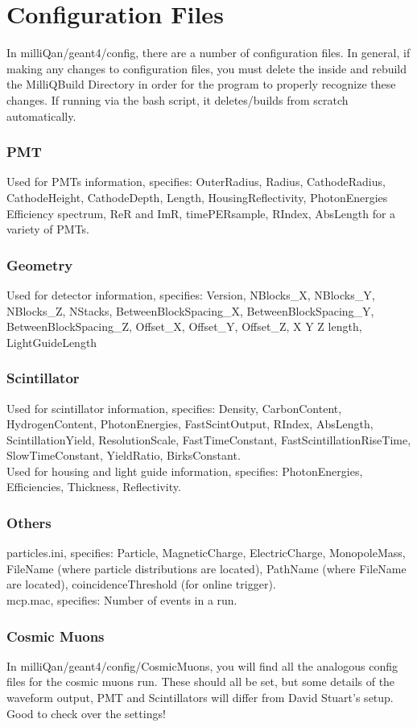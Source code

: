 \documentclass[prd,noshowpacs,nofootinbib,amsmath,amssymb,superscriptaddress]{revtex4}
\begin{document}
\section{Configuration Files}
In milliQan/geant4/config, there are a number of configuration files. In general, if making any changes to configuration files, you must delete the inside and rebuild the MilliQBuild Directory in order for the program to properly recognize these changes. If running via the bash script, it deletes/builds from scratch automatically. 
\subsubsection{PMT}
Used for PMTs information, specifies: OuterRadius, Radius, CathodeRadius, CathodeHeight, CathodeDepth, Length, HousingReflectivity, PhotonEnergies Efficiency spectrum, ReR and ImR, timePERsample, RIndex, AbsLength for a variety of PMTs.
\subsubsection{Geometry}
Used for detector information, specifies: Version, NBlocks\_X, NBlocks\_Y, NBlocks\_Z, NStacks, BetweenBlockSpacing\_X, BetweenBlockSpacing\_Y, BetweenBlockSpacing\_Z, Offset\_X, Offset\_Y, Offset\_Z, X Y Z length, LightGuideLength 
\subsubsection{Scintillator}
Used for scintillator information, specifies: Density, CarbonContent, HydrogenContent, PhotonEnergies, FastScintOutput, RIndex, AbsLength, ScintillationYield, ResolutionScale, FastTimeConstant, FastScintillationRiseTime, SlowTimeConstant, YieldRatio, BirksConstant.\\
Used for housing and light guide information, specifies: PhotonEnergies, Efficiencies, Thickness, Reflectivity.
\subsubsection{Others}
particles.ini, specifies: Particle, MagneticCharge, ElectricCharge, MonopoleMass, FileName (where particle distributions are located), PathName (where FileName are located), coincidenceThreshold (for online trigger).\\
mcp.mac, specifies: Number of events in a run.
\subsubsection{Cosmic Muons}
In milliQan/geant4/config/CosmicMuons, you will find all the analogous config files for the cosmic muons run. These should all be set, but some details of the waveform output, PMT and Scintillators will differ from David Stuart's setup. Good to check over the settings!
\end{document}
